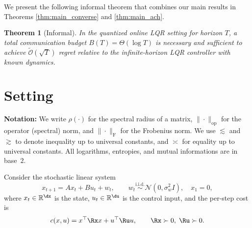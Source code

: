 \documentclass[11pt,journal,onecolumn]{IEEEtran}
\newtheorem*{theorem*}{Theorem}
\begin{document}
We present the following informal theorem that combines our main results in Theorems \ref{thm:main_converse} and \ref{thm:main_ach}.

\begin{theorem*}[Informal]
    In the quantized online LQR setting for horizon $T$, a total communication budget $B(T)=\Theta(\log T)$ is necessary and sufficient to achieve $\tilde{\mathcal{O}}(\sqrt{T})$ regret relative to the infinite-horizon LQR controller with known dynamics.
\end{theorem*}



\section{Setting}\label{sec:setting}

\textbf{Notation:} We write $\rho(\cdot)$ for the spectral radius of a matrix, $\|\cdot\|_{\mathrm{op}}$ for the operator (spectral) norm, and $\|\cdot\|_{\mathrm{F}}$ for the Frobenius norm. We use $\lesssim$ and $\gtrsim$ to denote inequality up to universal constants, and $\asymp$ for equality up to universal constants. All logarithms, entropies, and mutual informations are in base~$2$.

Consider the stochastic linear system
\begin{equation}
    x_{t+1} = A x_t + B u_t + w_t,\qquad
    w_t \stackrel{\text{i.i.d.}}{\sim} \mathcal N(0,\sigma_w^2 I), \quad x_1=0,
    \label{eq:sys}
\end{equation}
where $x_t \in \mathbb{R}^{\dx}$ is the state, $u_t \in \mathbb{R}^{\du}$ is the control input, and the per-step cost is
\begin{equation}\label{eq:cost-fn}
    c(x,u) = x^\top \Rx x + u^\top \Ru u, \qquad \Rx\succ 0,\; \Ru\succ 0.
\end{equation}
\end{document}
